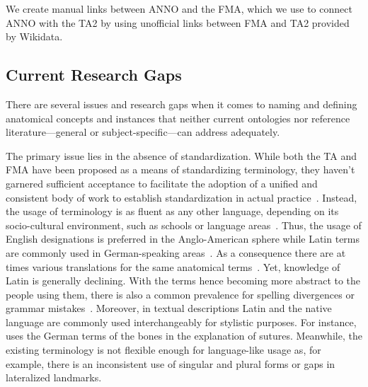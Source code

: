 \documentclass[sw]{iosart2x}
\begin{document}
We create manual links between ANNO and the FMA, which we use to connect ANNO with the TA2 by using unofficial links between FMA and TA2 provided by Wikidata.

\subsection{Current Research Gaps}

There are several issues and research gaps when it comes to naming and defining anatomical concepts and instances that neither current ontologies nor reference literature---general or subject-specific---can address adequately.

The primary issue lies in the absence of standardization.
While both the TA and FMA have been proposed as a means of standardizing terminology, they haven't garnered sufficient acceptance to facilitate the adoption of a unified and consistent body of work to establish standardization in actual practice~\citep{frequencyta,doestamatter,athighlights}.
Instead, the usage of terminology is as fluent as any other language, depending on its socio-cultural environment, such as schools or language areas~\citep{doestamatter,atthennow,atinfo,frequencyta,atcompare}.
Thus, the usage of English designations is preferred in the Anglo-American sphere while Latin terms are commonly used in German-speaking areas~\citep{anatomycontribution,anatomylexicon,reforminganatomical}.
As a consequence there are at times various translations for the same anatomical terms~\citep{naminggame}.
Yet, knowledge of Latin is generally declining.
With the terms hence becoming more abstract to the people using them, there is also a common prevalence for spelling divergences or grammar mistakes~\citep{ta17,anatomylexicon,athighlights,diphthongs}.
Moreover, in textual descriptions Latin and the native language are commonly used interchangeably for stylistic purposes.
For instance, \cite{anatomylexicon} uses the German terms of the bones in the explanation of sutures.
Meanwhile, the existing terminology is not flexible enough for language-like usage as, for example, there is an inconsistent use of singular and plural forms or gaps in lateralized landmarks.
\end{document}
